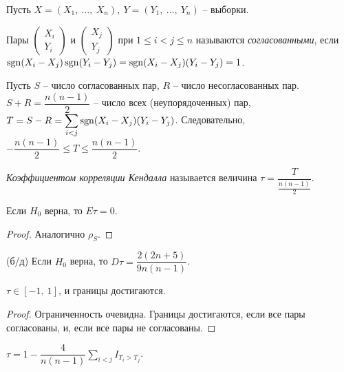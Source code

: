 Пусть $\displaystyle X=( X_{1} ,\ \dotsc ,\ X_{n}) ,\ Y=( Y_{1} ,\ \dotsc ,\ Y_{n})$ -- выборки.
\begin{definition}
    Пары $\displaystyle \begin{pmatrix}
    X_{i}\\
    Y_{i}
    \end{pmatrix}$ и $\displaystyle \begin{pmatrix}
    X_{j}\\
    Y_{j}
    \end{pmatrix}$ при $\displaystyle 1\leqslant i< j\leqslant n$ называются \textit{согласованными}, если $\displaystyle \operatorname{\mathop{sgn}}( X_{i} -X_{j})\operatorname{\mathop{sgn}}( Y_{i} -Y_{j}) =\operatorname{\mathop{sgn}}( X_{i} -X_{j})( Y_{i} -Y_{j}) =1$.
\end{definition}
Пусть $\displaystyle S$ -- число согласованных пар, $\displaystyle R$ -- число несогласованных пар. $\displaystyle S+R=\dfrac{n( n-1)}{2}$ -- число всех (неупорядоченных) пар, $\displaystyle T=S-R=\sum _{i< j}\operatorname{\mathop{sgn}}( X_{i} -X_{j})( Y_{i} -Y_{j})$. Следовательно, $\displaystyle -\dfrac{n( n-1)}{2} \leqslant T\leqslant \dfrac{n( n-1)}{2}$.
\begin{definition}
    \textit{Коэффициентом корреляции Кендалла} называется величина $\displaystyle \tau =\dfrac{T}{\frac{n( n-1)}{2}}$.
\end{definition}
\begin{proposition}
    Если $\displaystyle H_{0}$ верна, то $\displaystyle E\tau =0$.
\end{proposition}
\begin{proof}
    Аналогично $\displaystyle \rho _{S}$.
\end{proof}
\begin{proposition}
    (б/д) Если $\displaystyle H_{0}$ верна, то $\displaystyle D\tau =\dfrac{2( 2n+5)}{9n( n-1)}$.
\end{proposition}
\begin{proposition}
    $\displaystyle \tau \in [ -1,\ 1]$, и границы достигаются.
\end{proposition}
\begin{proof}
    Ограниченность очевидна. Границы достигаются, если все пары согласованы, и, если все пары не согласованы.
\end{proof}
\begin{proposition}
    $\displaystyle \tau =1-\dfrac{4}{n( n-1)}\sum _{i< j} I_{T_{i}  >T_{j}}$.
\end{proposition}
